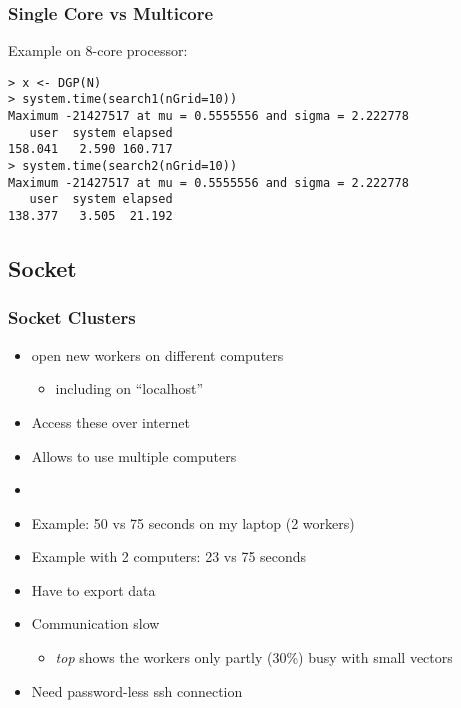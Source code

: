 \documentclass[pdftex]{beamer}
\begin{document}
\begin{frame}[fragile]
  \frametitle{Single Core vs Multicore }
  Example on 8-core processor: 
\begin{lstlisting}
> x <- DGP(N)
> system.time(search1(nGrid=10))
Maximum -21427517 at mu = 0.5555556 and sigma = 2.222778 
   user  system elapsed 
158.041   2.590 160.717 
> system.time(search2(nGrid=10))
Maximum -21427517 at mu = 0.5555556 and sigma = 2.222778 
   user  system elapsed 
138.377   3.505  21.192 
\end{lstlisting}
  
\end{frame}

\subsection{Socket}

\begin{frame}
  \frametitle{Socket Clusters}
  \begin{itemize}
  \item open new workers on different computers
    \begin{itemize}
    \item including on ``localhost''
    \end{itemize}
  \item Access these over internet
  \item Allows to use multiple computers
  \item {}
  \item Example: 50 vs 75 seconds on my laptop (2 workers)
  \item Example with 2 computers: 23 vs 75 seconds
    \pause
  \item Have to export data
  \item Communication slow
    \begin{itemize}
    \item \emph{top} shows the workers only partly (30\%) busy with
      small vectors
    \end{itemize}
  \item Need password-less ssh connection
  \end{itemize}
\end{frame}
\end{document}
